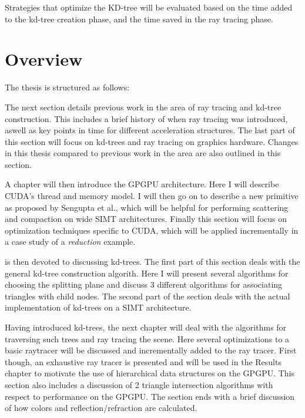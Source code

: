 Strategies that optimize the KD-tree will be evaluated based on the
time added to the kd-tree creation phase, and the time saved in the
ray tracing phase.

\section{Overview}

The thesis is structured as follows:


The next section details previous work in the area of ray tracing and
kd-tree construction. This includes a brief history of when ray
tracing was introduced, aswell as key points in time for different
acceleration structures. The last part of this section will focus on
kd-trees and ray tracing on graphics hardware. Changes in this thesis
compared to previous work in the area are also outlined in this
section.


A chapter will then introduce the GPGPU architecture. Here I will
describe CUDA's thread and memory model. I will then go on to describe
a new primitive as proposed by Sengupta et
al., which will be helpful for performing
scattering and compaction on wide SIMT architectures. Finally this
section will focus on optimization techniques specific to CUDA, which
will be applied incrementally in a case study of a \textit{reduction}
example.


 is then devoted to discussing kd-trees. The
first part of this section deals with the general kd-tree construction
algorith. Here I will present several algorithms for choosing the
splitting plane and discuss 3 different algorithms for associating
triangles with child nodes. The second part of the section deals with
the actual implementation of kd-trees on a SIMT architecture.


Having introduced kd-trees, the next chapter will deal with the
algorithms for traversing such trees and ray tracing the scene. Here
several optimizations to a basic raytracer will be discussed and
incrementally added to the ray tracer. First though, an exhaustive ray
tracer is presented and will be used in the Results chapter to
motivate the use of hierarchical data structures on the GPGPU. This
section also includes a discussion of 2 triangle intersection
algorithms with respect to performance on the GPGPU. The section ends
with a brief discussion of how colors and reflection/refraction
are calculated.



